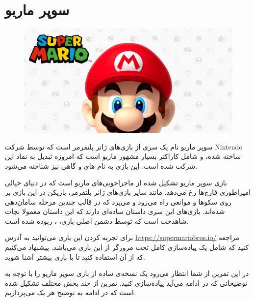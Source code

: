 \documentclass{utap}
\begin{document}
	\section{سوپر ماریو}
	
	\begin{figure}[H]
		\begin{center}
			\includegraphics[width=\textwidth]{cover.jpg}
		\end{center}
	\end{figure}
سوپر ماریو نام یک سری از بازی‌های ژانر پلتفرمر  است که توسط شرکت Nintendo ساخته شده، و شامل کاراکتر بسیار مشهور ماریو است که امروزه تبدیل به نماد این شرکت شده است. این بازی به نام های  و گاهی  نیز شناخته می‌شود.

بازی سوپر ماریو تشکیل شده از ماجراجویی‌های ماریو است که در دنیای خیالی امپراطوری قارچ‌ها  رخ می‌دهد. مانند سایر بازی‌های ژانر پلتفرمر، بازیکن در این بازی بر روی سکو‌ها و موانعی راه می‌رود و می‌پرد که در قالب چندین مرحله‌ سامان‌دهی شده‌اند. بازی‌های این سری داستان ساده‌ای دارند که این داستان معمولا نجات شاهدخت  است که توسط دشمن اصلی بازی، ، ربوده شده است.

برای تجربه کردن این بازی می‌توانید به آدرس \url{https://supermariobros.io/} مراجعه کنید که شامل یک پیاده‌سازی کامل تحت مرورگر از این بازی می‌باشد. پیشنهاد می‌کنیم که از آن استفاده کنید تا با بازی بیشتر آشنا شوید.

در این تمرین از شما انتظار می‌رود یک نسخه‌ی ساده از بازی سوپر ماریو را با توجه به توضیحاتی که در ادامه می‌آید پیاده‌سازی کنید. تمرین از چند بخش مختلف تشکیل شده است که در ادامه به توضیح هر یک می‌پردازیم.
\end{document}
